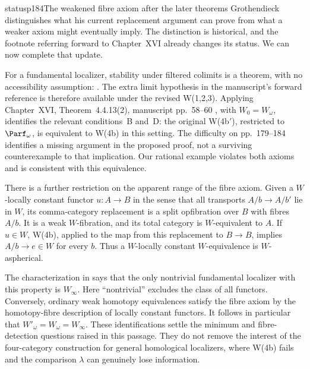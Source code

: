 \begin{dcomment}{status}{p184}{The weakened fibre axiom after the later theorems}
Grothendieck distinguishes what his current replacement argument can prove from what a weaker axiom might eventually imply. The distinction is historical, and the footnote referring forward to Chapter~XVI already changes its status. We can now complete that update.

For a fundamental localizer, stability under filtered colimits is a theorem, with no accessibility assumption: \citet[Corollary~4.2.22]{Cisinski2006}. The extra limit hypothesis in the manuscript's forward reference is therefore available under the revised W(1,2,3). Applying Chapter~XVI, Theorem~4.4.13(2), manuscript pp.~58--60 \citep{GrothendieckDerivateursXVI}, with $W_0=W_\omega$, identifies the relevant conditions~B and~D: the original W(4b$'$), restricted to $\Parf_\omega$, is equivalent to W(4b) in this setting. The difficulty on pp.~179--184 identifies a missing argument in the proposed proof, not a surviving counterexample to that implication. Our rational example violates both axioms and is consistent with this equivalence.

There is a further restriction on the apparent range of the fibre axiom. Given a $W$-locally constant functor $u:A\to B$ in the sense that all transports $A/b\to A/b'$ lie in $W$, its comma-category replacement is a split opfibration over $B$ with fibres $A/b$. It is a weak $W$-fibration, and its total category is $W$-equivalent to $A$. If $u\in W$, W(4b), applied to the map from this replacement to $B\to B$, implies $A/b\to e\in W$ for every $b$. Thus a $W$-locally constant $W$-equivalence is $W$-aspherical.

The characterization in \citet[Theorem~6.4.22 and Remark~6.4.23]{Cisinski2006} says that the only nontrivial fundamental localizer with this property is $W_\infty$. Here ``nontrivial'' excludes the class of all functors. Conversely, ordinary weak homotopy equivalences satisfy the fibre axiom by the homotopy-fibre description of locally constant functors. It follows in particular that $W'_\omega=W_\omega=W_\infty$. These identifications settle the minimum and fibre-detection questions raised in this passage. They do not remove the interest of the four-category construction for general homological localizers, where W(4b) fails and the comparison $\lambda$ can genuinely lose information.
\end{dcomment}


